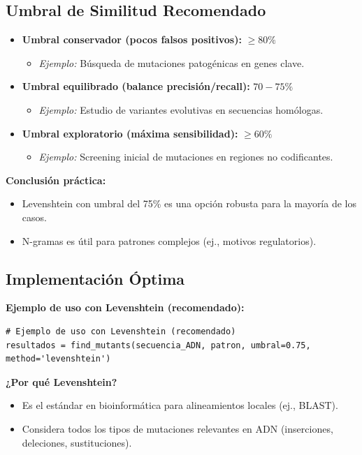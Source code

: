 \documentclass[fleqn,10pt]{article}
\begin{document}
\subsection{Umbral de Similitud Recomendado}
\begin{itemize}
    \item \textbf{Umbral conservador (pocos falsos positivos):} \(\geq 80\%\)
        \begin{itemize}
            \item \textit{Ejemplo:} Búsqueda de mutaciones patogénicas en genes clave.
        \end{itemize}
    \item \textbf{Umbral equilibrado (balance precisión/recall):} \(70-75\%\)
        \begin{itemize}
            \item \textit{Ejemplo:} Estudio de variantes evolutivas en secuencias homólogas.
        \end{itemize}
    \item \textbf{Umbral exploratorio (máxima sensibilidad):} \(\geq 60\%\)
        \begin{itemize}
            \item \textit{Ejemplo:} Screening inicial de mutaciones en regiones no codificantes.
        \end{itemize}
\end{itemize}

\textbf{Conclusión práctica:}
\begin{itemize}
    \item Levenshtein con umbral del 75\% es una opción robusta para la mayoría de los casos.
    \item N-gramas es útil para patrones complejos (ej., motivos regulatorios).
\end{itemize}

\subsection{Implementación Óptima}
\textbf{Ejemplo de uso con Levenshtein (recomendado):}
\begin{lstlisting}[style=pythonstyle, numbers=none, frame=none, backgroundcolor=\color{white}]
# Ejemplo de uso con Levenshtein (recomendado)
resultados = find_mutants(secuencia_ADN, patron, umbral=0.75, method='levenshtein')
\end{lstlisting}

\textbf{¿Por qué Levenshtein?}
\begin{itemize}
    \item Es el estándar en bioinformática para alineamientos locales (ej., BLAST).
    \item Considera todos los tipos de mutaciones relevantes en ADN (inserciones, deleciones, sustituciones).
\end{itemize}
\end{document}
